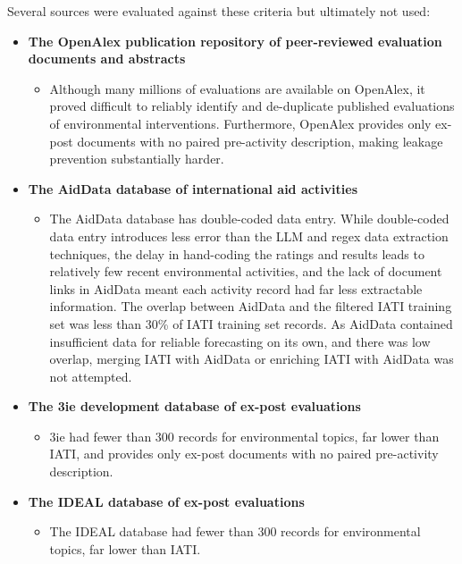 Several sources were evaluated against these criteria but ultimately not used:
\begin{itemize}
\item \textbf{The OpenAlex publication repository of peer-reviewed evaluation documents and abstracts} \citep{priemOpenAlexFullyopenIndex2022}
\begin{itemize}
\item Although many millions of evaluations are available on OpenAlex, it proved difficult to reliably identify and de-duplicate published evaluations of environmental interventions. Furthermore, OpenAlex provides only ex-post documents with no paired pre-activity description, making leakage prevention substantially harder.
\end{itemize}
\item \textbf{The AidData database of international aid activities} \citep{tierneyMoreDollarsSense2011}
\begin{itemize}
\item The AidData database has double-coded data entry. While double-coded data entry introduces less error than the LLM and regex data extraction techniques, the delay in hand-coding the ratings and results leads to relatively few recent environmental activities, and the lack of document links in AidData meant each activity record had far less extractable information. The overlap between AidData and the filtered IATI training set was less than 30\% of IATI training set records. As AidData contained insufficient data for reliable forecasting on its own, and there was low overlap, merging IATI with AidData or enriching IATI with AidData was not attempted.
\end{itemize}
\item \textbf{The 3ie development database of ex-post evaluations} \citep{3ieDevelopmentEvidence}
\begin{itemize}
\item 3ie had fewer than 300 records for environmental topics, far lower than IATI, and provides only ex-post documents with no paired pre-activity description.
\end{itemize}
\item \textbf{The IDEAL database of ex-post evaluations} \citep{kfwdevelopmentbankIDEaL}
\begin{itemize}
\item The IDEAL database had fewer than 300 records for environmental topics, far lower than IATI.
\end{itemize}
\end{itemize}

